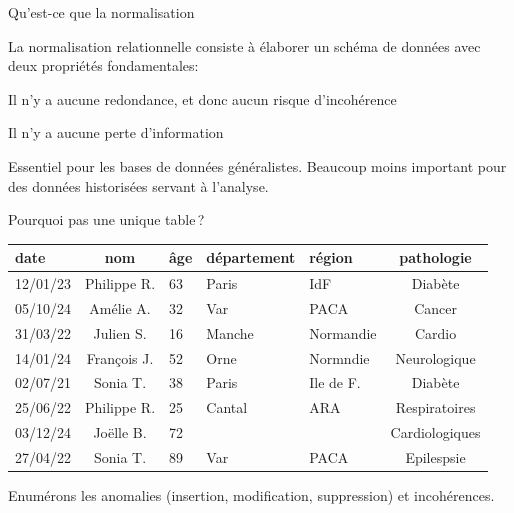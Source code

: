 
\begin{frame}[fragile]{Qu'est-ce que la normalisation}

La \alert{normalisation} relationnelle consiste à élaborer
un schéma de données avec deux propriétés fondamentales\;:

\vfill 

\begin{redbullet}
  \item Il n'y a \alert{aucune} redondance, et donc aucun risque \alert{d'incohérence}
  \item Il n'y a aucune \alert{perte d'information}
\end{redbullet}

\vfill


\begin{noteblock}
Essentiel pour les bases de données généralistes. Beaucoup moins important
pour des données historisées
servant à l'analyse.
\end{noteblock}

\end{frame}




\begin{frame}{Pourquoi pas une unique table\,?}

\begin{small}
\begin{center}
\begin{tabular}{l|c|l|l|l|c}
 date &  nom &  âge & département &  région &  pathologie \\
\hline
12/01/23 & Philippe R. & 63 &Paris & IdF & Diabète\\
05/10/24 & Amélie A. & 32 & Var & PACA & Cancer\\
31/03/22  & Julien S. & 16 & Manche & Normandie & Cardio\\
14/01/24 & François J. &  52 & Orne & Normndie  & Neurologique \\
02/07/21 & Sonia T. & 38 & Paris & Ile de F. & Diabète \\
25/06/22 & Philippe R. & 25 &Cantal  & ARA  &  Respiratoires\\
03/12/24 & Joëlle B.  & 72 & &  & Cardiologiques\\
27/04/22  & Sonia T.  & 89 & Var & PACA & Epilespsie\\
\hline
\end{tabular}
\end{center}
\end{small}

\vfill

Enumérons les \alert{anomalies}  (insertion, modification, suppression)
et \alert{incohérences}.
\end{frame}



